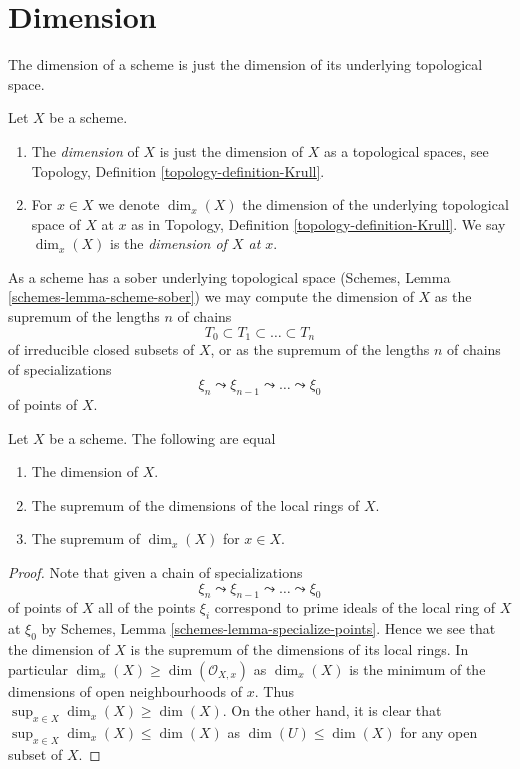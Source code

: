 \section{Dimension}
\label{section-dimension}

\noindent
The dimension of a scheme is just the dimension of its underlying
topological space.

\begin{definition}
\label{definition-dimension}
Let $X$ be a scheme.
\begin{enumerate}
\item The {\it dimension} of $X$ is just the dimension of $X$
as a topological spaces, see
Topology, Definition \ref{topology-definition-Krull}.
\item For $x \in X$ we denote $\dim_x(X)$ the dimension of the underlying
topological space of $X$ at $x$ as in
Topology, Definition \ref{topology-definition-Krull}.
We say $\dim_x(X)$ is the {\it dimension of $X$ at $x$}.
\end{enumerate}
\end{definition}

\noindent
As a scheme has a sober underlying topological space
(Schemes, Lemma \ref{schemes-lemma-scheme-sober})
we may compute the dimension of $X$ as the supremum of the lengths $n$
of chains
$$
T_0 \subset T_1 \subset \ldots \subset T_n
$$
of irreducible closed subsets of $X$, or as the supremum of the lengths $n$
of chains of specializations
$$
\xi_n \leadsto \xi_{n - 1} \leadsto \ldots \leadsto \xi_0
$$
of points of $X$.

\begin{lemma}
\label{lemma-dimension}
Let $X$ be a scheme. The following are equal
\begin{enumerate}
\item The dimension of $X$.
\item The supremum of the dimensions of the local rings of $X$.
\item The supremum of $\dim_x(X)$ for $x \in X$.
\end{enumerate}
\end{lemma}

\begin{proof}
Note that given a chain of specializations
$$
\xi_n \leadsto \xi_{n - 1} \leadsto \ldots \leadsto \xi_0
$$
of points of $X$ all of the points $\xi_i$ correspond to prime ideals
of the local ring of $X$ at $\xi_0$ by
Schemes, Lemma \ref{schemes-lemma-specialize-points}.
Hence we see that the dimension of $X$ is the supremum of the dimensions
of its local rings. In particular $\dim_x(X) \geq \dim(\mathcal{O}_{X, x})$
as $\dim_x(X)$ is the minimum of the dimensions of open neighbourhoods of
$x$. Thus $\sup_{x \in X} \dim_x(X) \geq \dim(X)$. On the other hand,
it is clear that $\sup_{x \in X} \dim_x(X) \leq \dim(X)$
as $\dim(U) \leq \dim(X)$ for any open subset of $X$.
\end{proof}

